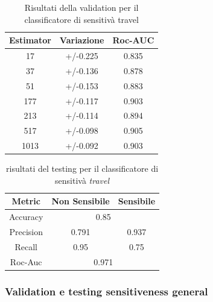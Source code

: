 \begin{table}[h]

\centering
\begin{tabular}{|c|c|c|}
\hline
\textbf{Estimator} & \textbf{Variazione} & \textbf{Roc-AUC} \\ \hline
17 & +/-0.225 & 0.835 \\ \hline
37 & +/-0.136 & 0.878 \\ \hline
51 & +/-0.153 & 0.883 \\ \hline
177 & +/-0.117 & 0.903 \\ \hline
213 & +/-0.114 & 0.894 \\ \hline
517 & +/-0.098 & 0.905 \\ \hline
1013 & +/-0.092 & 0.903 \\ \hline
\end{tabular}
\caption{Risultati della validation per il classificatore di sensitivà travel}
\label{tbl:val_sens_travel}
\end{table}
\FloatBarrier

\begin{table}[h]

\centering
\begin{tabular}{|c|c|c|}
\hline
\textbf{Metric} & \textbf{Non Sensibile} & \textbf{Sensibile} \\ \hline
Accuracy & \multicolumn{2}{c|}{0.85} \\ \hline
Precision & 0.791 & 0.937 \\ \hline
Recall & 0.95 & 0.75 \\ \hline
Roc-Auc & \multicolumn{2}{c|}{0.971} \\ \hline
\end{tabular}
\caption{risultati del testing per il classificatore di sensitivà \textit{travel}}
\label{tbl:training_sens_travel}
\end{table}
\FloatBarrier


\subsubsection{Validation e testing sensitiveness general}
\label{sssec:val_testing_general}

